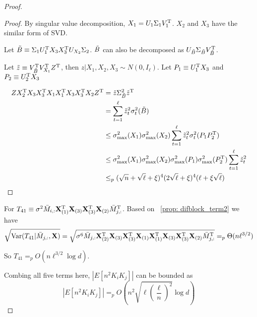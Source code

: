 \begin{proof}
\begin{proof}
By singular value decomposition, $X_1 = U_1\Sigma_{1}V^{\mathrm{T}}_{1}$. $X_2$ and $X_3$ have the similar form of SVD.

Let $\Tilde{B} \equiv \Sigma_{1}U^{\mathrm{T}}_{1}X_{3} X^{\mathrm{T}}_{3}U_{X_{2}}\Sigma_{2}$. $\Tilde{B}$ can also be decomposed as $U_{\Tilde{B}}\Sigma_{\Tilde{B}}V^{\mathrm{T}}_{\Tilde{B}}$.

Let $\Tilde{z} \equiv V^{\mathrm{T}}_{\Tilde{B}} V^{\mathrm{T}}_{X_{1}} Z^{\mathrm{T}}$, then $\left. z  \right| X_1, X_2, X_3 \sim N\left(0, I_{\ell}\right)$.
Let $P_1 \equiv U^{\mathrm{T}}_{1}X_{3}$ and $P_2 \equiv U^{\mathrm{T}}_{2}X_{3}$

\begin{equation}
\begin{split}
    Z X_2^{\mathrm{T}}X_3X_3^{\mathrm{T}}X_1X_1^{\mathrm{T}}X_3X_3^{\mathrm{T}}X_2 Z^{\mathrm{T}}
    &= \Tilde{z}\Sigma^2_{\Tilde{B}} \Tilde{z}^{\mathrm{T}}  \\ 
    &=\sum^{\ell}_{t = 1}\Tilde{z}^2_{t}\sigma^2_t(\Tilde{B}) \\
    &\leq   \sigma^{2}_{\max}(X_{1})\sigma^{2}_{\max}(X_{2}) \sum^{\ell}_{t = 1}\Tilde{z}^2_{t}\sigma^{2}_{t}(P_1P_2^{\mathrm{T}}) \\
    &\leq \sigma^{2}_{\max}(X_{1})\sigma^{2}_{\max}(X_{2})\sigma^2_{\max}(P_1) \sigma^2_{\max}(P^{\mathrm{T}}_2) \sum^{\ell}_{t = 1}\Tilde{z}^2_{t} \\ 
    &\leq_p (\sqrt{n} + \sqrt{\ell} + \xi)^{4}(2 \sqrt{\ell} + \xi)^{4}(\ell+\xi\sqrt{\ell})
\end{split}
\end{equation}
\end{proof}


For $T_{41} \equiv \sigma^2 \bar M_{i, :}\mathbf{X}_{(1)}^{\mathrm{T}}\mathbf{X}_{(3)}\mathbf{X}_{(3)}^{\mathrm{T}}\mathbf{X}_{(2)}\bar M^{\mathrm{T}}_{j, :}$.
Based on ~\ref{prop: difblock_term2} we have
\begin{equation}
\begin{split}
    \sqrt{\mathrm{Var}(T_{41}|\bar M_{j,:},\mathbf{X})} 
    =\sqrt{\sigma^6 \bar M_{j, :}\mathbf{X}^{\mathrm{T}}_{(2)}\mathbf{X}_{(3)}\mathbf{X}_{(3)}^{\mathrm{T}}\mathbf{X}_{(1)}\mathbf{X}^{\mathrm{T}}_{(1)}\mathbf{X}_{(3)}\mathbf{X}_{(3)}^{\mathrm{T}}\mathbf{X}_{(2)}\bar M^{\mathrm{T}}_{j, :}}    
    =_p \Theta( n \ell^{3/2} )
\end{split}
\end{equation}

So $T_{41} =_p O( n \ell^{3/2} \log d) $.

Combing all five terms here, $\left|E\left[ n^2 K_i K_j \right]\right|$ can be bounded as
\begin{equation}
    \left|E\left[ n^2 K_i K_j \right]\right| =_p O\left(  n^2 \sqrt{\ell\left(\frac{\ell}{n} \right)^2 } \log d \right)
\end{equation}


\end{proof}
